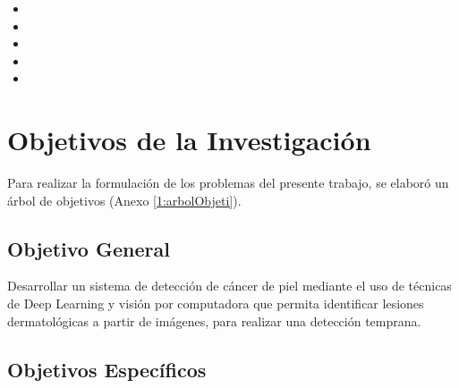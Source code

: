 \begin{itemize}
	\item \Pbone
	\item \Pbtwo
	\item \Pbthree
	\item \Pbfour
	\item \Pbfive
\end{itemize}

\section{Objetivos de la Investigación}

Para realizar la formulación de los problemas del presente trabajo, se elaboró un árbol de objetivos (Anexo \ref{1:arbolObjeti}).


\subsection{Objetivo General}
\newcommand{\ObjetivoGeneral}{
Desarrollar un sistema de detección de cáncer de piel mediante el uso de técnicas de Deep Learning y visión por computadora que permita identificar lesiones dermatológicas a partir de imágenes, para realizar una detección temprana.


}
\ObjetivoGeneral
\subsection{Objetivos Espec\'{i}ficos}
\newcommand{\Objone}{
Identificar y comparar los algoritmos de Deep Learning más adecuados para la clasificación de melanomas y no melanomas en imágenes dermatoscópicas de pacientes del Perú.
}
\newcommand{\Objtwo}{
Desarrollar un marco de evaluación que incluya métricas como precisión, sensibilidad, especificidad, valor predictivo positivo(VPP), acurancy y curvas ROC, con la finalidad de evaluar el rendimiento de los modelos de Deep Learning en la detección de melanoma y no melanoma de pacientes del Perú.
}
\newcommand{\Objthree}{
Identificar y evaluar el impacto de estos ruidos en la precisión de la clasificación de melanomas y no melanomas de pacientes del Perú.
}
\newcommand{\Objfour}{
Analizar los diferentes enfoques utilizados en investigaciones anteriores con la finalidad de desarrollar marcos de trabajo efectivos para la clasificación de melanomas y no melanomas de pacientes del Perú.
}
\newcommand{\Objfive}{
Analizar cómo las condiciones ambientales y geográficas pueden afectar los melanomas y no melanomas de pacientes del Perú.
}

